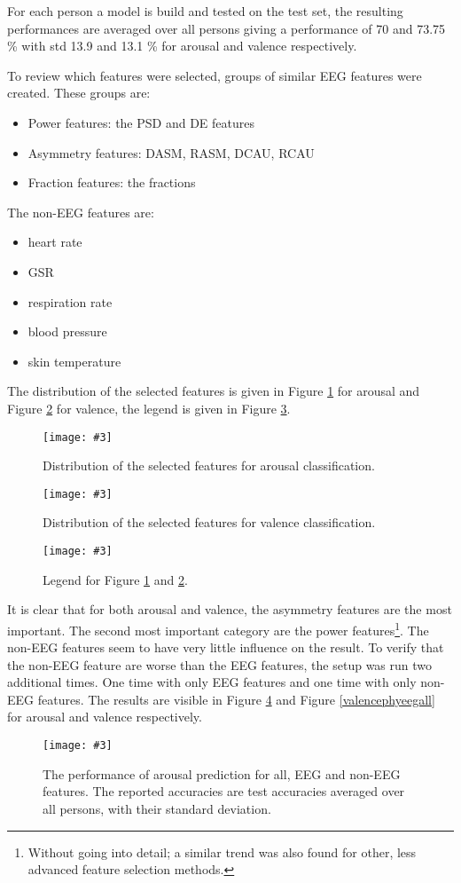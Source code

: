 \documentclass[12pt,journal,compsoc]{IEEEtran}
\newcommand{\npar}{\par \vspace{2.3ex plus 0.3ex minus 0.3ex}}
\newcommand{\mijnfiguur}[4][H]{            %
    \begin{figure}[#1]                      %
        \begin{center}                      %
            \texttt{[image: \#3]}        %
            \caption{#4\label{#3}}          %
        \end{center}
    \end{figure}
    }
\begin{document}
\npar

For each person a model is build and tested on the test set, the resulting performances are averaged over all persons giving a performance of  70 and 73.75 \% with std 13.9 and 13.1 \% for arousal and valence respectively. 

\npar

To review which features were selected, groups of similar EEG features were created. These groups are:
\begin{itemize}
\item Power features: the PSD and DE features
\item Asymmetry features: DASM, RASM, DCAU, RCAU
\item Fraction features: the fractions
\end{itemize}
The non-EEG features are:
\begin{itemize}
\item heart rate
\item GSR
\item respiration rate
\item blood pressure
\item skin temperature
\end{itemize}
The distribution of the selected features is given in Figure \ref{arousalALLRF} for arousal and Figure \ref{valenceALLRF} for valence, the legend is given in Figure \ref{legend}.

\mijnfiguur{width=0.25\textwidth}{arousalALLRF}{Distribution of the selected features for arousal classification.}
\mijnfiguur{width=0.25\textwidth}{valenceALLRF}{Distribution of the selected features for valence classification.}
\mijnfiguur{width=0.25\textwidth}{legend}{Legend for Figure \ref{arousalALLRF} and \ref{valenceALLRF}.}

It is clear that for both arousal and valence, the asymmetry features are the most important. The second most important category are the power features\footnote{Without going into detail; a similar trend was also found for other, less advanced feature selection methods.}. The non-EEG features seem to have very little influence on the result. To verify that the non-EEG feature are worse than the EEG features, the setup was run two additional times. One time with only EEG features and one time with only non-EEG features. The results are visible in Figure \ref{arousalphyeegall} and Figure \ref{valencephyeegall} for arousal and valence respectively. 

\mijnfiguur{width=.5\textwidth}{arousalphyeegall}{The performance of arousal prediction for all, EEG and non-EEG features. The reported accuracies are test accuracies averaged over all persons, with their standard deviation.}
\end{document}
